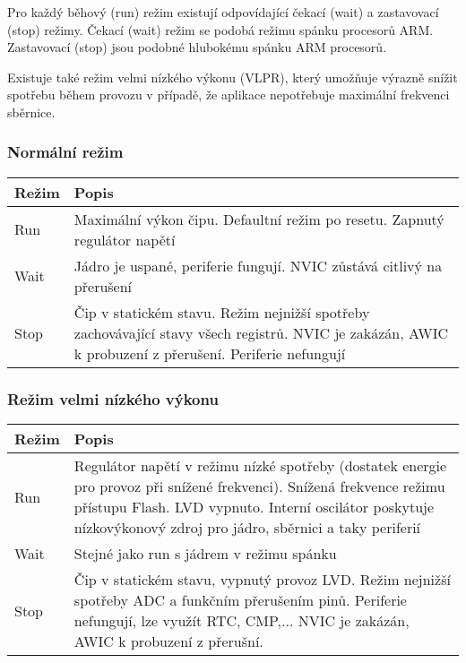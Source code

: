 \documentclass{article}
\begin{document}
Pro každý běhový (run) režim existují odpovídající čekací (wait) a zastavovací
(stop) režimy. Čekací (wait) režim se podobá režimu spánku procesorů ARM.
Zastavovací (stop) jsou podobné hlubokému spánku ARM procesorů.

Existuje také režim velmi nízkého výkonu (VLPR), který umožňuje výrazně snížit
spotřebu během provozu v případě, že aplikace nepotřebuje maximální frekvenci
sběrnice.

\subsubsection{Normální režim}

\begin{tabularx}{\textwidth}{|>{\centering\arraybackslash}p{}|X|}
    \hline
    \textbf{Režim} & \textbf{Popis} \\
    \hline
    Run & Maximální výkon čipu. Defaultní režim po resetu. Zapnutý regulátor
    napětí \\
    \hline
    Wait & Jádro je uspané, periferie fungují. NVIC zůstává citlivý na
    přerušení \\
    \hline
    Stop & Čip v statickém stavu. Režim nejnižší spotřeby zachovávající stavy
    všech registrů. NVIC je zakázán, AWIC k probuzení z přerušení. Periferie
    nefungují \\
    \hline
\end{tabularx}

\subsubsection{Režim velmi nízkého výkonu}

\begin{tabularx}{\textwidth}{|>{\centering\arraybackslash}p{}|X|}
    \hline
    \textbf{Režim} & \textbf{Popis} \\
    \hline
    Run & Regulátor napětí v režimu nízké spotřeby (dostatek energie pro
    provoz při snížené frekvenci). Snížená frekvence režimu přístupu Flash.
    LVD vypnuto. Interní oscilátor poskytuje nízkovýkonový zdroj pro jádro,
    sběrnici a taky periferií \\
    \hline
    Wait & Stejné jako run s jádrem v režimu spánku \\
    \hline
    Stop & Čip v statickém stavu, vypnutý provoz LVD. Režim nejnižší spotřeby
    ADC a funkčním přerušením pinů. Periferie nefungují, lze využít RTC,
    CMP,... NVIC je zakázán, AWIC k probuzení z přerušní. \\
    \hline
\end{tabularx}
\end{document}
